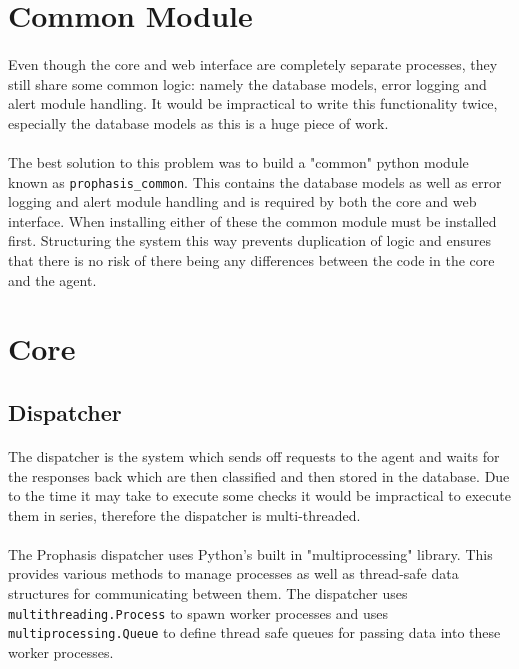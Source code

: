 \documentclass[bsc,logo,twoside]{infthesis}
\begin{document}
\section{Common Module}
\paragraph*{}
	Even though the core and web interface are completely separate processes, they
	still share some common logic: namely the database models, error logging and
	alert module handling.  It would be impractical to write this functionality
	twice, especially the database models as this is a huge piece of work.
	
\paragraph*{}
	The best solution to this problem was to build a "common" python module known
	as \texttt{prophasis\_common}.  This contains the database models as well as
	error logging and alert module handling and is required by both the core and
	web interface.  When installing either of these the common module must be
	installed first.  Structuring the system this way prevents duplication of
	logic and ensures that there is no risk of there being any differences between
	the code in the core and the agent.

\section{Core}
\subsection{Dispatcher}
\paragraph*{}
	The dispatcher is the system which sends off requests to the agent and waits
	for the responses back which are then classified and then stored in the
	database.  Due to the time it may take to execute some checks it would be
	impractical to execute them in series, therefore the dispatcher is
	multi-threaded.

\paragraph*{}
	The Prophasis dispatcher uses Python's built in "multiprocessing" library. This
	provides various methods to manage processes as well as thread-safe data
	structures for communicating between them.  The dispatcher uses
	\texttt{multithreading.Process} to spawn worker processes and uses
	\texttt{multiprocessing.Queue} to define thread safe queues for passing data
	into these worker processes.
\end{document}
